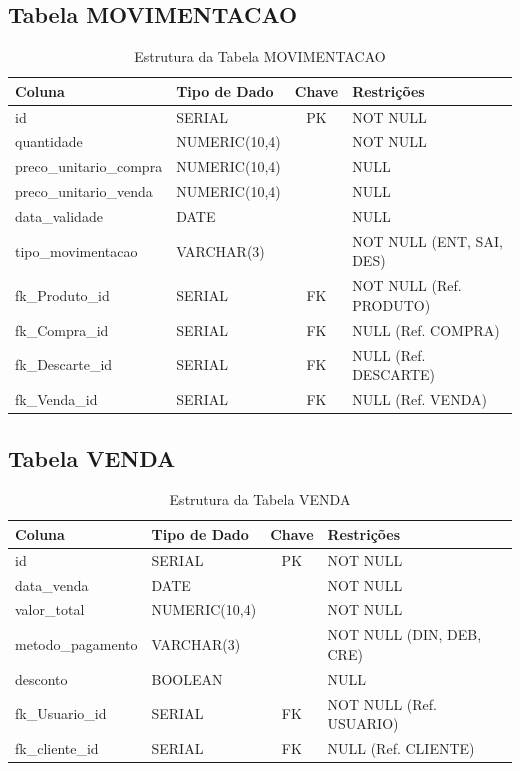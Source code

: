 \documentclass[
	12pt,				%
	openany,			%
	oneside,			%
	a4paper,			%
	english,			%
	french,				%
	spanish,			%
	brazil				%
	]{abntex2}
\begin{document}
\begin{apendicesenv}
\subsection{Tabela MOVIMENTACAO}
\begin{longtable}{|l|l|c|p{6cm}|}
    \caption{Estrutura da Tabela MOVIMENTACAO} \label{tab:dic_movimentacao} \\
    \hline \textbf{Coluna} & \textbf{Tipo de Dado} & \textbf{Chave} & \textbf{Restrições} \\ \hline
    \endhead
    id & SERIAL & PK & NOT NULL \\ \hline
    quantidade & NUMERIC(10,4) & & NOT NULL \\ \hline
    preco\_unitario\_compra & NUMERIC(10,4) & & NULL \\ \hline
    preco\_unitario\_venda & NUMERIC(10,4) & & NULL \\ \hline
    data\_validade & DATE & & NULL \\ \hline
    tipo\_movimentacao & VARCHAR(3) & & NOT NULL (ENT, SAI, DES) \\ \hline 
    fk\_Produto\_id & SERIAL & FK & NOT NULL (Ref. PRODUTO) \\ \hline
    fk\_Compra\_id & SERIAL & FK & NULL (Ref. COMPRA) \\ \hline
    fk\_Descarte\_id & SERIAL & FK & NULL (Ref. DESCARTE) \\ \hline
    fk\_Venda\_id & SERIAL & FK & NULL (Ref. VENDA) \\ \hline
\end{longtable}

\subsection{Tabela VENDA}
\begin{longtable}{|l|l|c|p{6cm}|}
    \caption{Estrutura da Tabela VENDA} \label{tab:dic_venda} \\
    \hline \textbf{Coluna} & \textbf{Tipo de Dado} & \textbf{Chave} & \textbf{Restrições} \\ \hline
    \endhead
    id & SERIAL & PK & NOT NULL \\ \hline
    data\_venda & DATE & & NOT NULL \\ \hline
    valor\_total & NUMERIC(10,4) & & NOT NULL \\ \hline
    metodo\_pagamento & VARCHAR(3) & & NOT NULL (DIN, DEB, CRE) \\ \hline
    desconto & BOOLEAN & & NULL \\ \hline
    fk\_Usuario\_id & SERIAL & FK & NOT NULL (Ref. USUARIO) \\ \hline
    fk\_cliente\_id & SERIAL & FK & NULL (Ref. CLIENTE) \\ \hline
\end{longtable}


\end{apendicesenv}
\end{document}
